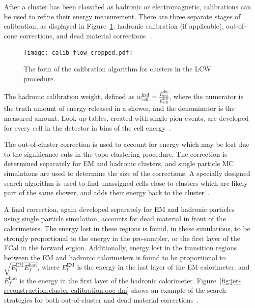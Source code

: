 
After a cluster has been classified as hadronic or electromagnetic,  calibrations can be used to refine their energy measurement. There are three separate stages of calibration, as displayed in Figure~\ref{fig:jet-reconstruction:cluster-calibration:calib-flow}: hadronic calibration (if applicable), out-of-cone corrections, and dead material corrections~\cite{Loch:1967028}.


\begin{figure}
\centering
\texttt{[image: calib\_flow\_cropped.pdf]}
\label{fig:jet-reconstruction:cluster-calibration:calib-flow}
\caption{The form of the calibration algorithm for clusters in the LCW procedure.}
\end{figure}


The hadronic calibration weight, defined as $w_\mathrm{cell}^\mathrm{had} = \frac{{E}^\mathrm{dep}_\mathrm{cell}}{E^\mathrm{EM}_\mathrm{cell}}$, where the numerator is the truth amount of energy released in a shower, and the denominator is the measured amount. Look-up tables, created with single pion events, are developed for every cell in the detector in bins of the cell energy~\cite{Loch:1967028}.

The out-of-cluster correction is used to account for energy which may be lost due to the significance cuts in the topo-clustering procedure. The correction is determined separately for EM and hadronic clusters, and single particle MC simulations are used to determine the size of the corrections. A specially designed search algorithm is used to find unassigned cells close to clusters which are likely part of the same shower, and adds their energy back to the cluster~\cite{Loch:1967028}.

A final correction, again developed separately for EM and hadronic particles using single particle simulation, accounts for dead material in front of the calorimeters. The energy lost in these regions is found, in these simulations, to be strongly proportional to the energy in the pre-sampler, or the first layer of the FCal in the forward ergion. Additionally, energy lost in the transition regions between the EM and hadronic calorimeters is found to be proportional to $\sqrt{E_l^\mathrm{EM} E_f^\mathrm{had}}$, where $E_l^\mathrm{EM}$ is the energy in the last layer of the EM calorimeter, and $E_f^\mathrm{had}$ is the energy in the first layer of the hadronic calorimeter. Figure~\ref{fig:jet-reconstruction:cluster-calibration:ooc-dm} shows an example of the search strategies for both out-of-cluster and dead material corrections~\cite{Loch:1967028}. 


